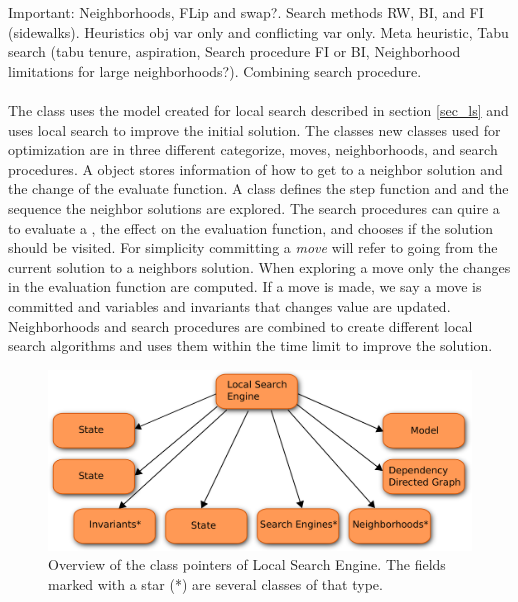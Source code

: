 Important: Neighborhoods, FLip and swap?. Search methods RW, BI, and FI (sidewalks). Heuristics obj var only and 
conflicting var only. Meta heuristic, Tabu search (tabu tenure, aspiration, Search procedure FI or BI, Neighborhood 
limitations for large neighborhoods?). Combining search procedure.  \\ \\ 
The  class uses the model created for local search described in section \ref{sec_ls} and 
uses local search to improve the initial solution. The classes new classes used for optimization are in three different 
categorize, moves, neighborhoods, and search procedures. A  object stores information of how to get to a 
neighbor solution and the change of the evaluate function.  A  class defines the step function and 
and the sequence the neighbor solutions are explored. The search procedures can quire a  to 
evaluate a , the effect on the evaluation function,  and chooses if the solution should be visited. For 
simplicity committing a \emph{move} will refer to going from the current solution to a neighbors solution. When 
exploring a move only the changes in the evaluation function are computed. If a move is made, we say a move is 
committed and variables and invariants that changes value are updated. \\ 
Neighborhoods and search procedures are combined to create different local search algorithms and 
 uses them within the time limit to improve the solution. \\ 
\begin{figure}[!b]
\begin{center}
\includegraphics[width=0.9\linewidth]{LSE}\caption{Overview of the class pointers of Local Search Engine. The fields 
marked with a star (*) are several classes of that type.} 
\label{fig_lse}
\end{center}
\end{figure}



